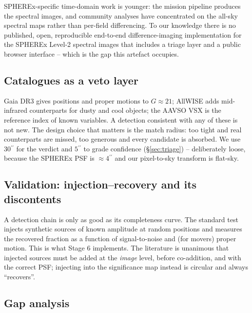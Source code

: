 \documentclass[11pt,a4paper]{article}
\newcommand{\arcsec}{\ensuremath{{}^{\prime\prime}}}
\begin{document}
SPHEREx-specific time-domain work is younger: the mission pipeline produces the spectral images, and
community analyses have concentrated on the all-sky spectral maps rather than per-field differencing.
To our knowledge there is no published, open, reproducible end-to-end difference-imaging
implementation for the SPHEREx Level-2 spectral images that includes a triage layer and a public
browser interface -- which is the gap this artefact occupies.

\subsection{Catalogues as a veto layer}

Gaia DR3 gives positions and proper motions to $G\approx21$; AllWISE adds mid-infrared counterparts
for dusty and cool objects; the AAVSO VSX is the reference index of known variables. A detection
consistent with any of these is not new. The design choice that matters is the match radius: too
tight and real counterparts are missed, too generous and every candidate is absorbed. We use
$30\arcsec$ for the verdict and $5\arcsec$ to grade confidence (\S\ref{sec:triage}) -- deliberately
loose, because the SPHEREx PSF is $\approx4\arcsec$ and our pixel-to-sky transform is flat-sky.

\subsection{Validation: injection--recovery and its discontents}

A detection chain is only as good as its completeness curve. The standard test injects synthetic
sources of known amplitude at random positions and measures the recovered fraction as a function of
signal-to-noise and (for movers) proper motion. This is what Stage 6 implements. The literature is
unanimous that injected sources must be added at the \emph{image} level, before co-addition, and with
the correct PSF; injecting into the significance map instead is circular and always ``recovers''.

\subsection{Gap analysis}
\label{sec:gap}
\end{document}
